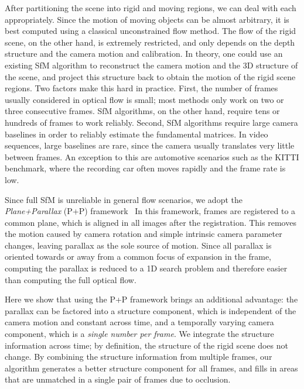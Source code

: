 \documentclass[10pt,twocolumn,letterpaper]{article}
\begin{document}
After partitioning the scene into rigid and moving regions, we can deal with each appropriately.
Since the motion of moving objects can be almost arbitrary, it is best computed using a classical unconstrained flow method.
The flow of the rigid scene, on the other hand, is extremely restricted, and only depends on the depth structure and the camera motion and calibration.
In theory, one could use an existing SfM algorithm to reconstruct the camera motion and the 3D structure of the scene, and project this structure back to obtain the motion of the rigid scene regions. Two factors make this hard in practice.
First, the number of frames usually considered in optical flow is small; most methods only work on two or three consecutive frames.
SfM algorithms, on the other hand, require tens or hundreds of frames to work reliably.
Second, SfM algorithms require large camera baselines in order to reliably estimate the fundamental matrices.
In video sequences, large baselines are rare, since the camera usually translates very little between frames.
An exception to this are automotive scenarios such as the KITTI benchmark, where the recording car often moves rapidly and the frame rate is low.

Since full SfM is unreliable in general flow scenarios,
we adopt the \textit{Plane+Parallax} (P+P) framework~\cite{Irani:2002:MultiFramePPP,Irani:1998:ReferenceFrames,Sawhney:1994:3DGeometryPPP}
In this framework, frames are registered to a common plane, which is aligned in all images after the registration.
This removes the motion caused by camera rotation and simple intrinsic camera parameter changes, leaving parallax
as the sole source of motion.
Since all parallax is oriented towards or away from a common focus of expansion in the frame, computing the parallax is reduced to a 1D search problem and therefore easier than computing the full optical flow.

Here we show that using the P+P framework brings an additional advantage: the parallax can be factored into a structure component, which is independent of the camera motion and constant across time, and a temporally varying camera component, which is a \emph{single number per frame}.
We integrate the structure information across time; by definition, the structure of the rigid scene does not change.
By combining the structure information from multiple frames, our algorithm generates a better structure component for all frames, and fills in areas that are unmatched in a single pair of frames due to occlusion.
\end{document}
